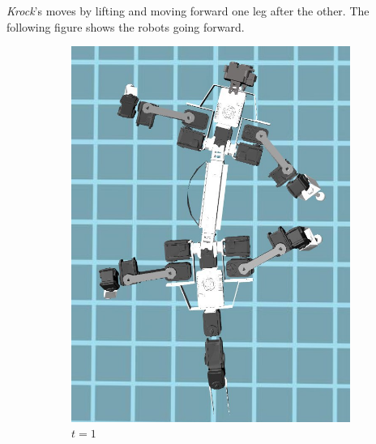 \documentclass[../document.tex]{subfiles}
\begin{document}
\emph{Krock}'s moves by lifting and moving forward one leg after the other. The following figure shows the robots going forward.
	\begin{figure}[H]
\centering
    	\begin{subfigure}[b]{0.3\textwidth}
			\includegraphics[width=\textwidth]{../img/krock-moving-1}
			\caption{$t=1$}
	    \end{subfigure}
		\begin{subfigure}[b]{0.3\textwidth}

\end{subfigure}
\end{figure}
\end{document}
